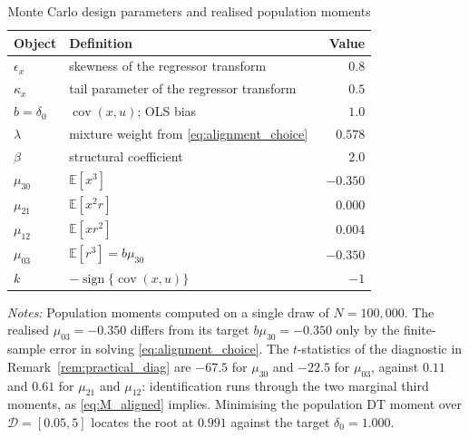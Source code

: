 \begin{table}[htbp]
\centering
\caption{Monte Carlo design parameters and realised population moments}
\label{tab:dgp_params}
\begin{threeparttable}
\begin{tabular}{llr}
\toprule
Object & Definition & Value \\
\midrule
\(\epsilon_x\)      & skewness of the regressor transform            & \(0.8\) \\
\(\kappa_x\)        & tail parameter of the regressor transform      & \(0.5\) \\
\(b=\delta_0\)      & \(\operatorname{cov}(x,u)\); OLS bias           & \(1.0\) \\
\(\lambda\)         & mixture weight from \eqref{eq:alignment_choice} & \(0.578\) \\
\(\beta\)           & structural coefficient                          & \(2.0\) \\
\midrule
\(\mu_{30}\)        & \(\mathbb E[x^{3}]\)                            & \(-0.350\) \\
\(\mu_{21}\)        & \(\mathbb E[x^{2}r]\)                           & \(\phantom{-}0.000\) \\
\(\mu_{12}\)        & \(\mathbb E[xr^{2}]\)                           & \(\phantom{-}0.004\) \\
\(\mu_{03}\)        & \(\mathbb E[r^{3}]=b\mu_{30}\)                  & \(-0.350\) \\
\(k\)               & \(-\operatorname{sign}\{\operatorname{cov}(x,u)\}\) & \(-1\) \\
\bottomrule
\end{tabular}
\begin{tablenotes}
\small
\item \textit{Notes:} Population moments computed on a single draw of
\(N=100{,}000\). The realised \(\mu_{03}=-0.350\) differs from its target
\(b\mu_{30}=-0.350\) only by the finite-sample error in solving
\eqref{eq:alignment_choice}. The \(t\)-statistics of the diagnostic in
Remark~\ref{rem:practical_diag} are \(-67.5\) for \(\mu_{30}\) and \(-22.5\) for
\(\mu_{03}\), against \(0.11\) and \(0.61\) for \(\mu_{21}\) and \(\mu_{12}\):
identification runs through the two marginal third moments, as
\eqref{eq:M_aligned} implies. Minimising the population DT moment over
\(\mathcal D=[0.05,5]\) locates the root at \(0.991\) against the target
\(\delta_0=1.000\).
\end{tablenotes}
\end{threeparttable}
\end{table}
